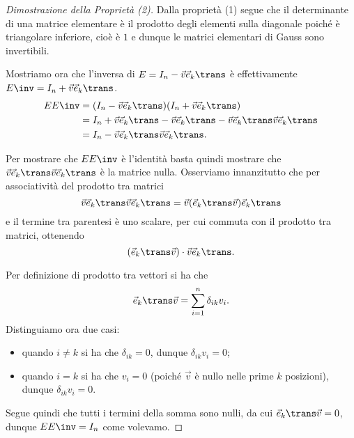 \begin{proof}[Dimostrazione della Proprietà (2)]
    Dalla proprietà (1) segue che il determinante di una matrice elementare è il prodotto degli elementi sulla diagonale poiché è triangolare inferiore, cioè è $1$ e dunque le matrici elementari di Gauss sono invertibili.
    
    Mostriamo ora che l'inversa di $E = I_n - \vec v\vec e_k\trans$ è effettivamente $E\inv = I_n + \vec v\vec e_k\trans$.
    \begin{align*}
        EE\inv &= (I_n - \vec v\vec e_k\trans)(I_n + \vec v\vec e_k\trans) \\
        &= I_n + \vec v\vec e_k\trans - \vec v\vec e_k\trans - \vec v\vec e_k\trans\vec v\vec e_k\trans \\
        &= I_n - \vec v\vec e_k\trans\vec v\vec e_k\trans.
    \end{align*}

    Per mostrare che $EE\inv$ è l'identità basta quindi mostrare che $\vec v\vec e_k\trans\vec v\vec e_k\trans$ è la matrice nulla. Osserviamo innanzitutto che per associatività del prodotto tra matrici \[
        \vec v\vec e_k\trans\vec v\vec e_k\trans = \vec v(\vec e_k\trans\vec v)\vec e_k\trans
    \] e il termine tra parentesi è uno scalare, per cui commuta con il prodotto tra matrici, ottenendo \[
        (\vec e_k\trans\vec v) \cdot \vec v\vec e_k\trans.
    \]

    Per definizione di prodotto tra vettori si ha che \[
        \vec e_k\trans\vec v = \sum_{i=1}^n \delta_{ik}v_i.
    \] Distinguiamo ora due casi:
    \begin{itemize}
        \item quando $i \neq k$ si ha che $\delta_{ik} = 0$, dunque $\delta_{ik}v_i = 0$;
        \item quando $i = k$ si ha che $v_i = 0$ (poiché $\vec v$ è nullo nelle prime $k$ posizioni), dunque $\delta_{ik}v_i = 0$.    
    \end{itemize}

    Segue quindi che tutti i termini della somma sono nulli, da cui $\vec e_k\trans\vec v = 0$, dunque $EE\inv = I_n$ come volevamo.
\end{proof}

